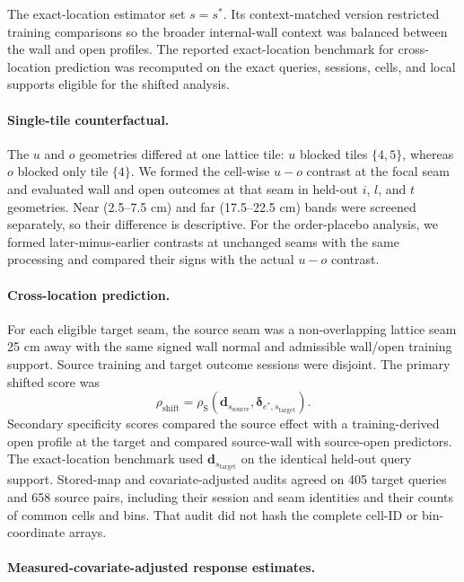 \documentclass[10pt,twocolumn]{article}
\begin{document}
The exact-location estimator set \(s=s^\ast\). Its context-matched version
restricted training comparisons so the broader internal-wall context was
balanced between the wall and open profiles. The reported exact-location
benchmark for cross-location prediction was recomputed on the exact queries, sessions,
cells, and local supports eligible for the shifted analysis.

\paragraph{Single-tile counterfactual.}

The \(u\) and \(o\) geometries differed at one lattice tile: \(u\) blocked
tiles \(\{4,5\}\), whereas \(o\) blocked only tile \(\{4\}\). We formed the
cell-wise \(u-o\) contrast at the focal seam and evaluated wall and open
outcomes at that seam in held-out \(i\), \(l\), and \(t\) geometries. Near
(2.5--7.5 cm) and far (17.5--22.5 cm) bands were screened separately, so their
difference is descriptive. For the order-placebo analysis, we formed
later-minus-earlier contrasts at unchanged seams with the same processing and
compared their signs with the actual \(u-o\) contrast.

\paragraph{Cross-location prediction.}

For each eligible target seam, the source seam was a non-overlapping lattice
seam 25 cm away with the same signed wall normal and admissible wall/open
training support. Source training and target outcome sessions were disjoint.
The primary shifted score was
\[
  \rho_{\mathrm{shift}}
  =\rho_{\mathrm S}
    \left(\mathbf d_{s_{\mathrm{source}}},
    \boldsymbol{\delta}_{e^\ast,s_{\mathrm{target}}}\right).
\]
Secondary specificity scores compared the source effect with a
training-derived open profile at the target and compared source-wall with
source-open predictors. The exact-location benchmark used
\(\mathbf d_{s_{\mathrm{target}}}\) on the identical held-out query support.
Stored-map and covariate-adjusted audits agreed on 405 target queries and 658
source pairs, including their session and seam identities and their counts of
common cells and bins. That audit did not hash the complete cell-ID or
bin-coordinate arrays.

\paragraph{Measured-covariate-adjusted response estimates.}
\end{document}
